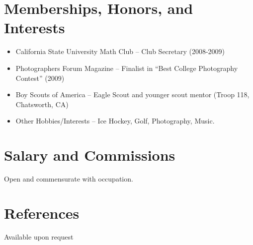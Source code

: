 \documentclass[12pt,table]{article}
\begin{document}
\section*{\sffamily Memberships, Honors, and Interests}
\begin{itemize}
	\item California State University Math Club – Club Secretary (2008-2009)
	\item Photographers Forum Magazine – Finalist in “Best College Photography Contest” (2009)
	\item Boy Scouts of America – Eagle Scout and younger scout mentor (Troop 118, Chatsworth, CA)
	\item Other Hobbies/Interests – Ice Hockey, Golf, Photography, Music.
\end{itemize}
\section*{\sffamily Salary and Commissions}
Open and commensurate with occupation.
\section*{\sffamily References}
Available upon request
\end{document}
